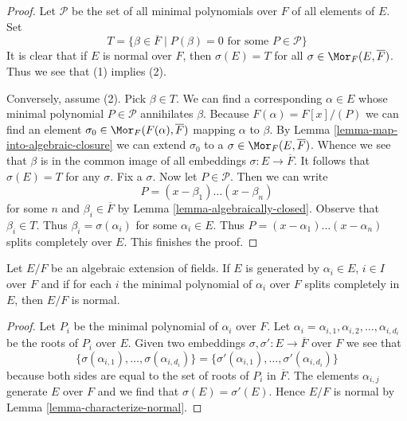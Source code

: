 \begin{proof}
Let $\mathcal{P}$ be the set of all minimal polynomials over $F$ of
all elements of $E$. Set
$$
T =
\{\beta \in \overline{F} \mid P(\beta) = 0\text{ for some }P \in \mathcal{P}\}
$$
It is clear that if $E$ is normal over $F$, then $\sigma(E) = T$
for all $\sigma \in \Mor_F(E, \overline{F})$. Thus we see that (1)
implies (2).

\medskip\noindent
Conversely, assume (2). Pick $\beta \in T$.
We can find a corresponding $\alpha \in E$ whose minimal polynomial
$P \in \mathcal{P}$ annihilates $\beta$. Because $F(\alpha) = F[x]/(P)$
we can find an element $\sigma_0 \in \Mor_F(F(\alpha), \overline{F})$ mapping
$\alpha$ to $\beta$. By Lemma \ref{lemma-map-into-algebraic-closure}
we can extend $\sigma_0$ to a $\sigma \in \Mor_F(E, \overline{F})$.
Whence we see that $\beta$ is in the common image of all embeddings
$\sigma : E \to \overline{F}$. It follows that $\sigma(E) = T$
for any $\sigma$. Fix a $\sigma$. Now let $P \in \mathcal{P}$. Then we
can write
$$
P = (x - \beta_1) \ldots (x - \beta_n)
$$
for some $n$ and $\beta_i \in \overline{F}$ by
Lemma \ref{lemma-algebraically-closed}. Observe that $\beta_i \in T$.
Thus $\beta_i = \sigma(\alpha_i)$ for some $\alpha_i \in E$. Thus
$P = (x - \alpha_1) \ldots (x - \alpha_n)$ splits completely over $E$.
This finishes the proof.
\end{proof}

\begin{lemma}
\label{lemma-normally-generated}
Let $E/F$ be an algebraic extension of fields.
If $E$ is generated by $\alpha_i \in E$, $i \in I$
over $F$ and if for each $i$ the minimal polynomial
of $\alpha_i$ over $F$ splits completely in $E$, then
$E/F$ is normal.
\end{lemma}

\begin{proof}
Let $P_i$ be the minimal polynomial of $\alpha_i$ over $F$.
Let $\alpha_i = \alpha_{i, 1}, \alpha_{i, 2}, \ldots, \alpha_{i, d_i}$
be the roots of $P_i$ over $E$. Given two embeddings
$\sigma, \sigma' : E \to \overline{F}$ over $F$ we see that
$$
\{\sigma(\alpha_{i, 1}), \ldots, \sigma(\alpha_{i, d_i})\} =
\{\sigma'(\alpha_{i, 1}), \ldots, \sigma'(\alpha_{i, d_i})\}
$$
because both sides are equal to the set of roots of $P_i$
in $\overline{F}$. The elements $\alpha_{i, j}$
generate $E$ over $F$ and we find that $\sigma(E) = \sigma'(E)$.
Hence $E/F$ is normal by Lemma \ref{lemma-characterize-normal}.
\end{proof}

